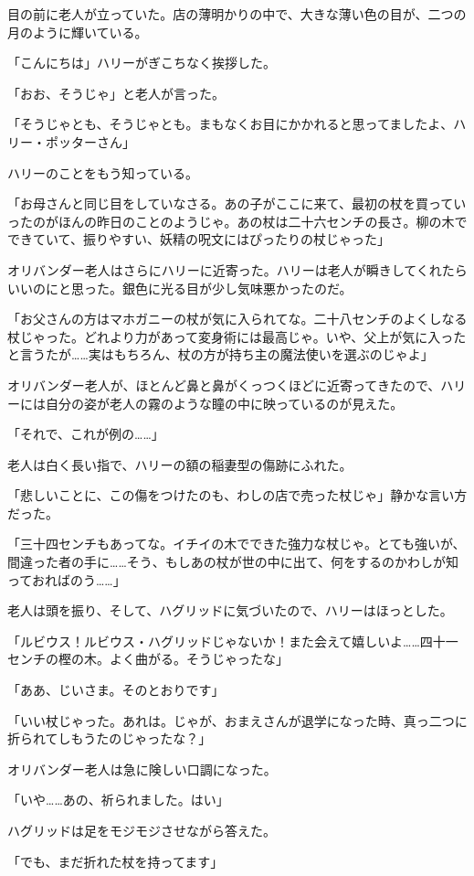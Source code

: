 \documentclass[10pt,a4paper]{article}
\begin{document}
\begin{CJK}{UTF8}{min}
目の前に老人が立っていた。店の薄明かりの中で、大きな薄い色の目が、二つの月のように輝いている。

「こんにちは」ハリーがぎこちなく挨拶した。

「おお、そうじゃ」と老人が言った。

「そうじゃとも、そうじゃとも。まもなくお目にかかれると思ってましたよ、ハリー・ポッターさん」

ハリーのことをもう知っている。

「お母さんと同じ目をしていなさる。あの子がここに来て、最初の杖を買っていったのがほんの昨日のことのようじゃ。あの杖は二十六センチの長さ。柳の木でできていて、振りやすい、妖精の呪文にはぴったりの杖じゃった」

オリバンダー老人はさらにハリーに近寄った。ハリーは老人が瞬きしてくれたらいいのにと思った。銀色に光る目が少し気味悪かったのだ。

「お父さんの方はマホガニーの杖が気に入られてな。二十八センチのよくしなる杖じゃった。どれより力があって変身術には最高じゃ。いや、父上が気に入ったと言うたが……実はもちろん、杖の方が持ち主の魔法使いを選ぶのじゃよ」

オリバンダー老人が、ほとんど鼻と鼻がくっつくほどに近寄ってきたので、ハリーには自分の姿が老人の霧のような瞳の中に映っているのが見えた。

「それで、これが例の……」

老人は白く長い指で、ハリーの額の稲妻型の傷跡にふれた。

「悲しいことに、この傷をつけたのも、わしの店で売った杖じゃ」静かな言い方だった。

「三十四センチもあってな。イチイの木でできた強力な杖じゃ。とても強いが、間違った者の手に……そう、もしあの杖が世の中に出て、何をするのかわしが知っておればのう……」

老人は頭を振り、そして、ハグリッドに気づいたので、ハリーはほっとした。

「ルビウス！ルビウス・ハグリッドじゃないか！また会えて嬉しいよ……四十一センチの樫の木。よく曲がる。そうじゃったな」

「ああ、じいさま。そのとおりです」

「いい杖じゃった。あれは。じゃが、おまえさんが退学になった時、真っ二つに折られてしもうたのじゃったな？」

オリバンダー老人は急に険しい口調になった。

「いや……あの、祈られました。はい」

ハグリッドは足をモジモジさせながら答えた。

「でも、まだ折れた杖を持ってます」


\end{CJK}
\end{document}
